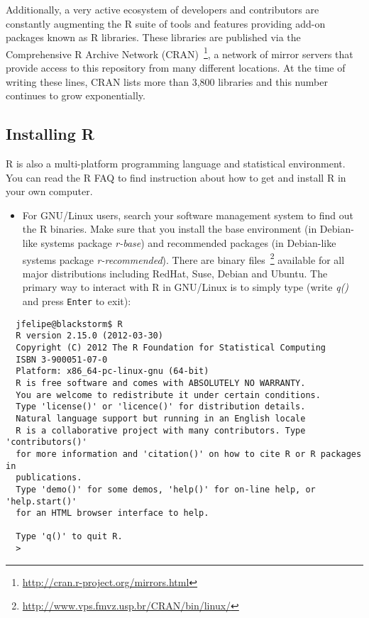 Additionally, a very active ecosystem of developers and contributors are 
constantly augmenting the R suite of tools and features providing add-on 
packages known as R libraries. These libraries are published via the 
Comprehensive R Archive Network 
(CRAN)~\footnote{\url{http://cran.r-project.org/mirrors.html}}, a network of mirror servers that provide 
access to this repository from many different locations. At the time of writing
these lines, CRAN lists more than 3,800 libraries and this number continues to 
grow exponentially.

\subsection{Installing R}
R is also a multi-platform programming language and statistical environment. 
You can read the R FAQ to find instruction about how to get and install R in 
your own computer.

\begin{itemize}
 \item For GNU/Linux users, search your software management system to find out 
the R binaries. Make sure that you install the base environment (in Debian-like 
systems package \textit{r-base}) and recommended packages (in Debian-like 
systems package \textit{r-recommended}). There are binary 
files~\footnote{\url{http://www.vps.fmvz.usp.br/CRAN/bin/linux/}} available for all 
major distributions including RedHat, Suse, Debian and Ubuntu. The primary way 
to interact with R in GNU/Linux is to simply type (write \textit{q()} and press
\texttt{Enter} to exit):
\end{itemize}

\begin{verbatim}
  jfelipe@blackstorm$ R
  R version 2.15.0 (2012-03-30)
  Copyright (C) 2012 The R Foundation for Statistical Computing
  ISBN 3-900051-07-0
  Platform: x86_64-pc-linux-gnu (64-bit)
  R is free software and comes with ABSOLUTELY NO WARRANTY. 
  You are welcome to redistribute it under certain conditions.
  Type 'license()' or 'licence()' for distribution details.
  Natural language support but running in an English locale
  R is a collaborative project with many contributors. Type 'contributors()' 
  for more information and 'citation()' on how to cite R or R packages in 
  publications.
  Type 'demo()' for some demos, 'help()' for on-line help, or 'help.start()' 
  for an HTML browser interface to help.
  
  Type 'q()' to quit R.
  > 
\end{verbatim}

